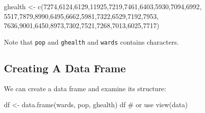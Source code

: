 \documentclass[
  letterpaper,
  DIV=11,
  numbers=noendperiod,
  oneside]{scrreprt}
\newenvironment{Shaded}{\begin{snugshade}}{\end{snugshade}}
\newcommand{\CommentTok}[1]{\textcolor[rgb]{0.37,0.37,0.37}{#1}}
\newcommand{\DecValTok}[1]{\textcolor[rgb]{0.68,0.00,0.00}{#1}}
\newcommand{\FunctionTok}[1]{\textcolor[rgb]{0.28,0.35,0.67}{#1}}
\newcommand{\NormalTok}[1]{\textcolor[rgb]{0.00,0.23,0.31}{#1}}
\newcommand{\OtherTok}[1]{\textcolor[rgb]{0.00,0.23,0.31}{#1}}
\begin{document}
\begin{Shaded}
\begin{Highlighting}[]
\NormalTok{ghealth }\OtherTok{\textless{}{-}} \FunctionTok{c}\NormalTok{(}\DecValTok{7274}\NormalTok{,}\DecValTok{6124}\NormalTok{,}\DecValTok{6129}\NormalTok{,}\DecValTok{11925}\NormalTok{,}\DecValTok{7219}\NormalTok{,}\DecValTok{7461}\NormalTok{,}\DecValTok{6403}\NormalTok{,}\DecValTok{5930}\NormalTok{,}\DecValTok{7094}\NormalTok{,}\DecValTok{6992}\NormalTok{,}
                 \DecValTok{5517}\NormalTok{,}\DecValTok{7879}\NormalTok{,}\DecValTok{8990}\NormalTok{,}\DecValTok{6495}\NormalTok{,}\DecValTok{6662}\NormalTok{,}\DecValTok{5981}\NormalTok{,}\DecValTok{7322}\NormalTok{,}\DecValTok{6529}\NormalTok{,}\DecValTok{7192}\NormalTok{,}\DecValTok{7953}\NormalTok{,}
                 \DecValTok{7636}\NormalTok{,}\DecValTok{9001}\NormalTok{,}\DecValTok{6450}\NormalTok{,}\DecValTok{8973}\NormalTok{,}\DecValTok{7302}\NormalTok{,}\DecValTok{7521}\NormalTok{,}\DecValTok{7268}\NormalTok{,}\DecValTok{7013}\NormalTok{,}\DecValTok{6025}\NormalTok{,}\DecValTok{7717}\NormalTok{)}
\end{Highlighting}
\end{Shaded}

Note that \texttt{pop} and \texttt{ghealth} and \texttt{wards} contains
characters.

\subsection{Creating A Data Frame}\label{creating-a-data-frame}

We can create a data frame and examine its structure:

\begin{Shaded}
\begin{Highlighting}[]
\NormalTok{df }\OtherTok{\textless{}{-}} \FunctionTok{data.frame}\NormalTok{(wards, pop, ghealth)}
\NormalTok{df }\CommentTok{\# or use view(data)}
\end{Highlighting}
\end{Shaded}
\end{document}
